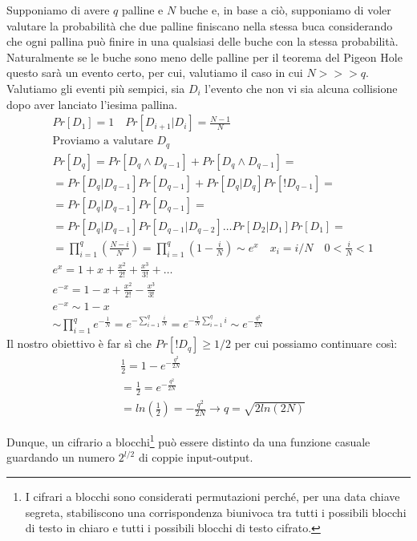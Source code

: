 Supponiamo di avere $q$ palline e $N$ buche e, in base a ciò, supponiamo di voler valutare la probabilità che due palline finiscano nella stessa buca considerando che ogni pallina può finire in una qualsiasi delle buche con la stessa probabilità. Naturalmente se le buche sono meno delle palline per il teorema del Pigeon Hole questo sarà un evento certo, per cui, valutiamo il caso in cui $N >>> q$. Valutiamo gli eventi più sempici, sia $D_i$ l'evento che non vi sia alcuna collisione dopo aver lanciato l'iesima pallina.
\begin{align*}
    &Pr[D_1] = 1 \quad Pr[D_{i+1}|D_i] = \frac{N-1}{N}\\
    &\text{Proviamo a valutare $D_q$}\\
    &Pr[D_q] = Pr[D_q \land D_{q-1}]+Pr[D_q \land \! D_{q-1}]=\\
    &= Pr[D_q|D_{q-1}]Pr[D_{q-1}]+ Pr[D_q| \!D_q] Pr[!D_{q-1}]=\\
    &=Pr[D_q|D_{q-1}]Pr[D_{q-1}]=\\
    &= Pr[D_q|D_{q-1}]Pr[D_{q-1}|D_{q-2}]\dots Pr[D_2|D_{1}] Pr[D_1]=\\
    &=\prod_{i=1}^{q} (\frac{N-i}{N}) = \prod_{i=1}^{q} (1-\frac{i}{N}) \sim e^x  \quad x_i = i/N \quad 0< \frac{i}{N}<1\\
    &e^x = 1+x+\frac{x^2}{2!}+\frac{x^3}{3!}+\dots\\
    &e^{-x} = 1 - x+\frac{x^2}{2!}-\frac{x^3}{3!}\\
    &e^{-x} \sim 1-x  \\
    &\sim \prod_{i=1}^{q}e^{-\frac{1}{N}} = e^{-\sum_{i=1}^q \frac{i}{N}} = e^{-\frac{1}{N}\sum_{i=1}^{q}i} \sim e^{-\frac{q^2}{2N}}
\end{align*}  
Il nostro obiettivo è far sì che $Pr[!D_q] \geq 1/2$ per cui possiamo continuare così:
\begin{align*}
    &\frac{1}{2}=1-e^{-\frac{q^2}{2N}}\\
    &=\frac{1}{2} = e^{-\frac{q^2}{2N}}\\
    &= ln(\frac{1}{2})=-\frac{q^2}{2N} \xrightarrow{} q = \sqrt{2ln(2N)}
\end{align*}

Dunque, un cifrario a blocchi\footnote{I cifrari a blocchi sono considerati permutazioni perché, per una data chiave segreta, stabiliscono una corrispondenza biunivoca tra tutti i possibili blocchi di testo in chiaro e tutti i possibili blocchi di testo cifrato.} può essere distinto da una funzione casuale guardando un numero $2^{l/2}$ di coppie input-output.